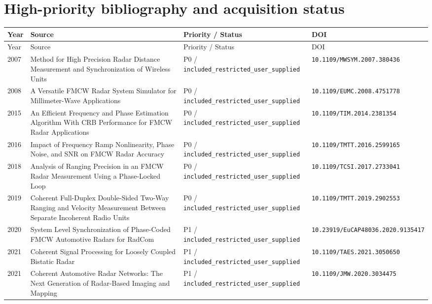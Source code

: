 \documentclass[11pt]{article}
\begin{document}
\section{High-priority bibliography and acquisition status}
\small
\begin{longtable}{@{}p{}p{}p{}p{}@{}}
\toprule Year & Source & Priority / Status & DOI \\ \midrule
\endfirsthead
\toprule Year & Source & Priority / Status & DOI \\ \midrule
\endhead
2007 & Method for High Precision Radar Distance Measurement and Synchronization of Wireless Units & P0 / \nolinkurl{included_restricted_user_supplied} & \nolinkurl{10.1109/MWSYM.2007.380436} \\
2008 & A Versatile FMCW Radar System Simulator for Millimeter-Wave Applications & P0 / \nolinkurl{included_restricted_user_supplied} & \nolinkurl{10.1109/EUMC.2008.4751778} \\
2015 & An Efficient Frequency and Phase Estimation Algorithm With CRB Performance for FMCW Radar Applications & P0 / \nolinkurl{included_restricted_user_supplied} & \nolinkurl{10.1109/TIM.2014.2381354} \\
2016 & Impact of Frequency Ramp Nonlinearity, Phase Noise, and SNR on FMCW Radar Accuracy & P0 / \nolinkurl{included_restricted_user_supplied} & \nolinkurl{10.1109/TMTT.2016.2599165} \\
2018 & Analysis of Ranging Precision in an FMCW Radar Measurement Using a Phase-Locked Loop & P0 / \nolinkurl{included_restricted_user_supplied} & \nolinkurl{10.1109/TCSI.2017.2733041} \\
2019 & Coherent Full-Duplex Double-Sided Two-Way Ranging and Velocity Measurement Between Separate Incoherent Radio Units & P0 / \nolinkurl{included_restricted_user_supplied} & \nolinkurl{10.1109/TMTT.2019.2902553} \\
2020 & System Level Synchronization of Phase-Coded FMCW Automotive Radars for RadCom & P1 / \nolinkurl{included_restricted_user_supplied} & \nolinkurl{10.23919/EuCAP48036.2020.9135417} \\
2021 & Coherent Signal Processing for Loosely Coupled Bistatic Radar & P1 / \nolinkurl{included_restricted_user_supplied} & \nolinkurl{10.1109/TAES.2021.3050650} \\
2021 & Coherent Automotive Radar Networks: The Next Generation of Radar-Based Imaging and Mapping & P1 / \nolinkurl{included_restricted_user_supplied} & \nolinkurl{10.1109/JMW.2020.3034475} \\

\end{longtable}
\end{document}
